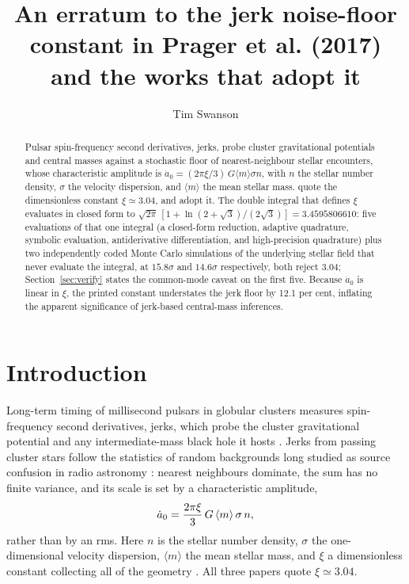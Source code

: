 \documentclass[twocolumn]{aastex701}
\begin{document}
\title{An erratum to the jerk noise-floor constant in Prager et al. (2017) and the works that adopt it}

\author{Tim Swanson}

\begin{abstract}
Pulsar spin-frequency second derivatives, jerks, probe cluster gravitational potentials and central masses against a stochastic floor of nearest-neighbour stellar encounters, whose characteristic amplitude is $\dot{a}_0=(2\pi\xi/3)\,G\langle m\rangle\sigma n$, with $n$ the stellar number density, $\sigma$ the velocity dispersion, and $\langle m\rangle$ the mean stellar mass. \citet{Prager2017} quote the dimensionless constant $\xi\simeq3.04$, and \citet{Abbate2018,Abbate2019} adopt it. The double integral that defines $\xi$ evaluates in closed form to $\sqrt{2\pi}\,[1+\ln(2+\sqrt{3})/(2\sqrt{3})]=3.4595806610$: five evaluations of that one integral (a closed-form reduction, adaptive quadrature, symbolic evaluation, antiderivative differentiation, and high-precision quadrature) plus two independently coded Monte Carlo simulations of the underlying stellar field that never evaluate the integral, at $15.8\sigma$ and $14.6\sigma$ respectively, both reject 3.04; Section~\ref{sec:verify} states the common-mode caveat on the first five. Because $\dot{a}_0$ is linear in $\xi$, the printed constant understates the jerk floor by 12.1 per cent, inflating the apparent significance of jerk-based central-mass inferences.
\end{abstract}


\section{Introduction} \label{sec:intro}

Long-term timing of millisecond pulsars in globular clusters measures spin-frequency second derivatives, jerks, which probe the cluster gravitational potential and any intermediate-mass black hole it hosts \citep{Prager2017,Abbate2018,Abbate2019}. Jerks from passing cluster stars follow the statistics of random backgrounds long studied as source confusion in radio astronomy \citep{Condon1974}: nearest neighbours dominate, the sum has no finite variance, and its scale is set by a characteristic amplitude,
\begin{equation}
\dot{a}_0={2\pi\xi\over 3}\,G\,\langle m\rangle\,\sigma\,n,
\label{eq:a0}
\end{equation}
rather than by an rms. Here $n$ is the stellar number density, $\sigma$ the one-dimensional velocity dispersion, $\langle m\rangle$ the mean stellar mass, and $\xi$ a dimensionless constant collecting all of the geometry \citep{Prager2017}. All three papers quote $\xi\simeq3.04$.
\end{document}
